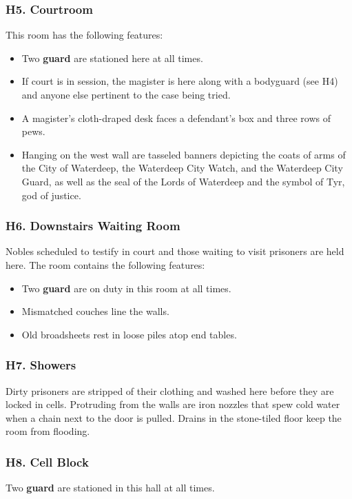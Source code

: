 \documentclass[10pt,a4paper,twoside,twocolumn,openany,nodeprecatedcode]{dndbook}
\begin{document}
\subsubsection{H5. Courtroom}
This room has the following features:
\begin{itemize}

\item Two \textbf{guard} are stationed here at all times.
\item If court is in session, the magister is here along with a bodyguard (see H4) and anyone else pertinent to the case being tried.
\item A magister's cloth-draped desk faces a defendant's box and three rows of pews.
\item Hanging on the west wall are tasseled banners depicting the coats of arms of the City of Waterdeep, the Waterdeep City Watch, and the Waterdeep City Guard, as well as the seal of the Lords of Waterdeep and the symbol of Tyr, god of justice.
\end{itemize}


\subsubsection{H6. Downstairs Waiting Room}
Nobles scheduled to testify in court and those waiting to visit prisoners are held here. The room contains the following features:
\begin{itemize}

\item Two \textbf{guard} are on duty in this room at all times.
\item Mismatched couches line the walls.
\item Old broadsheets rest in loose piles atop end tables.
\end{itemize}


\subsubsection{H7. Showers}
Dirty prisoners are stripped of their clothing and washed here before they are locked in cells. Protruding from the walls are iron nozzles that spew cold water when a chain next to the door is pulled. Drains in the stone-tiled floor keep the room from flooding.
\subsubsection{H8. Cell Block}
Two \textbf{guard} are stationed in this hall at all times.
\end{document}
